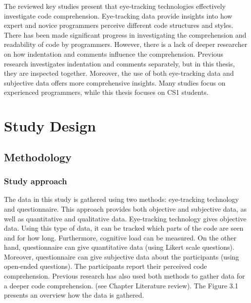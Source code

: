 The reviewed key studies present that eye-tracking technologies effectively investigate code comprehension.  Eye-tracking data provide insights into how expert and novice programmers perceive different code structures and styles. There has been made significant progress in investigating the comprehension and readability of code by programmers.  However, there is a lack of deeper researcher on how indentation and comments influence the comprehension.  Previous research investigates indentation and comments separately, but in this thesis, they are inspected together. Moreover, the use of both eye-tracking data and subjective data offers more comprehensive insights. Many studies focus on experienced programmers, while this thesis focuses on CS1 students. 





\chapter{Study Design}



\section{Methodology}

\subsection{Study approach} The data in this study is gathered using two methods: eye-tracking technology and questionnaire. This approach provides both objective and subjective data, as well as quantitative and qualitative data.
Eye-tracking technology gives objective data. Using this type of data, it can be tracked which parts of the code are seen and for how long. Furthermore, cognitive load can be measured.
On the other hand, questionnaire can give quantitative data (using Likert scale questions). Moreover, questionnaire can give subjective data about the participants (using open-ended questions). The participants report their perceived code comprehension.  
Previous research has also used both methods to gather data for a deeper code comprehension. (see Chapter Literature review). The Figure 3.1 presents an overview how the data is gathered. 



